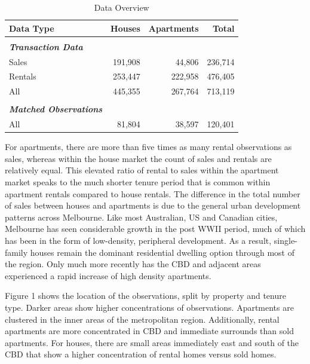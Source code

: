 \documentclass{article}\usepackage[]{graphicx}\usepackage[]{color}
\begin{document}
\begin{table}[ht]
\centering
\caption {Data Overview}
\footnotesize
\label{table:data}
\begin{tabular}{lrrr}
  \hline
  \hline
  \textbf{Data Type} & \textbf{Houses} & \textbf{Apartments} & \textbf{Total} \\
   \hline
   & & & \\
   \textbf{\textit{Transaction Data}} & & & \\
   \hline
  Sales & 191,908 & 44,806 & 236,714\\
  \hline
  Rentals & 253,447 & 222,958 & 476,405\\
  \hline
  All & 445,355 & 267,764 & 713,119 \\
  \hline
  \hline
  & & & \\
  \textbf{\textit{Matched Observations}}  & & & \\
  \hline
  All & 81,804 & 38,597 & 120,401 \\
  \hline
  \hline
  \end{tabular}
 \end{table}

For apartments, there are more than five times as many rental observations as sales, whereas within the house market the count of sales and rentals are relatively equal.  This elevated ratio of rental to sales within the apartment market speaks to the much shorter tenure period that is common within apartment rentals compared to house rentals.  The difference in the total number of sales between houses and apartments is due to the general urban development patterns across Melbourne.  Like most Australian, US and Canadian cities, Melbourne has seen considerable growth in the post WWII period, much of which has been in the form of low-density, peripheral development. As a result, single-family houses remain the dominant residential dwelling option through most of the region.  Only much more recently has the CBD and adjacent areas experienced a rapid increase of high density apartments.\par

Figure 1 shows the location of the observations, split by property and tenure type.  Darker areas show higher concentrations of observations.  Apartments are clustered in the inner areas of the metropolitan region.  Additionally, rental apartments are more concentrated in CBD and immediate surrounds than sold apartments.  For houses, there are small areas immediately east and south of the CBD that show a higher concentration of rental homes versus sold homes.\par
%
\end{document}
